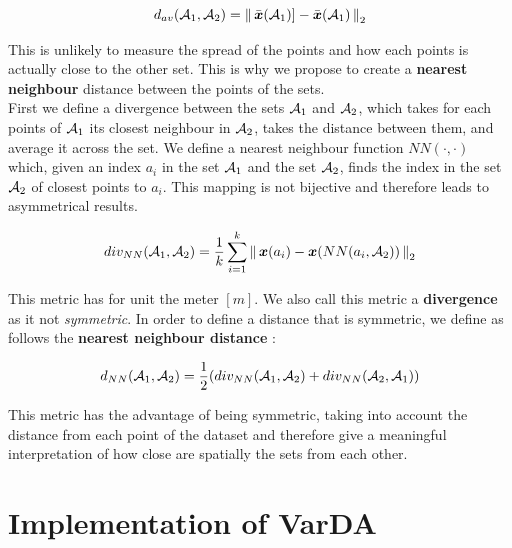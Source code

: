 \begin{equation}
	d_{av}(\mathcal{A}_1,\mathcal{A}_2) =  \left\lVert \,\bar{{\boldsymbol{{x}}}}(\mathcal{A}_1)] - \bar{{\boldsymbol{{x}}}}(\mathcal{A}_1)\, \right\rVert_2
\end{equation}

This is unlikely to measure the spread of the points and how each points is actually close to the other set. This is why we propose to create  a \textbf{nearest neighbour} distance between the points of the sets. \\

First we define a divergence between the sets $\mathcal{A}_1$ and $\mathcal{A}_2$, which takes for each points of $\mathcal{A}_1$ its closest neighbour in $\mathcal{A}_2$, takes the distance between them, and average it across the set. We define a nearest neighbour function $NN(\cdot,\cdot)$ which, given an index $a_i$ in the set $\mathcal{A}_1$ and the set $\mathcal{A}_2$, finds the index in the set $\mathcal{A}_2$ of closest points to $a_i$. This mapping is not bijective and therefore leads to asymmetrical results. 

\begin{equation}
	div_{NN}(\mathcal{A}_1,\mathcal{A}_2) = \frac{1}{k}\sum_{i=1}^k \left \lVert \,{\boldsymbol{{x}}}(a_i) - {\boldsymbol{{x}}}(NN(a_i,\mathcal{A}_2))\, \right \rVert_2
\end{equation}

This metric has for unit the meter $[m]$. We also call this metric a \textbf{divergence} as it not \textit{symmetric}. In order to define a distance that is symmetric, we define as follows the \textbf{nearest neighbour distance} :

\begin{equation}
	d_{NN}(\mathcal{A}_1,\mathcal{A}_2) = \frac{1}{2} (div_{NN}(\mathcal{A}_1,\mathcal{A}_2) + div_{NN}(\mathcal{A}_2,\mathcal{A}_1))
	\label{equ:distNN}
\end{equation}

This metric has the advantage of being symmetric, taking into account the distance from each point of the dataset and therefore give a meaningful interpretation of how close are spatially the sets from each other. 
%





\section{Implementation of VarDA}




